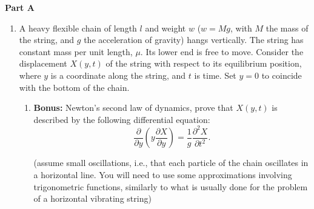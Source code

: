 \documentclass[fleqn]{article}
\begin{document}
  \textbf{Part A}
  \begin{enumerate}

    \item  A heavy flexible chain of length $l$ and weight $w$ ($w=Mg$, with $M$ the mass of the string, and $g$ the acceleration of gravity) hangs vertically. The string has constant mass per unit length, $\mu$.  Its lower end is free to move. Consider the displacement $X(y,t)$ of the string with respect to its equilibrium position, where $y$ is a coordinate along the string, and $t$ is time. Set $y=0$ to coincide with the bottom of the chain.  
      \begin{enumerate}
        \item {\bf Bonus: } Newton's second law of dynamics, prove that $X(y,t)$ is described by the following differential equation: 
      \begin{equation}
      \frac{\partial}{\partial y}\left( y\frac{\partial X}{\partial y} \right) = \frac{1}{g} \frac{\partial^2 X}{\partial t^2}.
      \label{eq:chainEOM}
      \end{equation}
      
      
      (assume small oscillations, i.e., that each particle of the chain oscillates in a horizontal line. You will need to use some approximations involving trigonometric functions, similarly to what is usually done for the problem of a horizontal vibrating string) 
      

\end{enumerate}
\end{enumerate}
\end{document}
